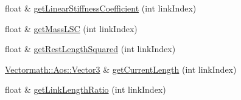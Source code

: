\begin{DoxyCompactItemize}
\item 
float \& \hyperlink{classbtSoftBodyLinkData_a971e0e406838f2c2d3b88db80747d09d}{get\+Linear\+Stiffness\+Coefficient} (int link\+Index)
\item 
float \& \hyperlink{classbtSoftBodyLinkData_a4738763134cedd630e826f2346947935}{get\+Mass\+L\+SC} (int link\+Index)
\item 
float \& \hyperlink{classbtSoftBodyLinkData_a7ea5bd9cf45bdf9ae4872437e0f867b8}{get\+Rest\+Length\+Squared} (int link\+Index)
\item 
\hyperlink{classVectormath_1_1Aos_1_1Vector3}{Vectormath\+::\+Aos\+::\+Vector3} \& \hyperlink{classbtSoftBodyLinkData_a9655532adc375429002af37fe757ef3b}{get\+Current\+Length} (int link\+Index)
\item 
float \& \hyperlink{classbtSoftBodyLinkData_a1d1b051d331898d172d709676dca5ad7}{get\+Link\+Length\+Ratio} (int link\+Index)
\end{DoxyCompactItemize}
